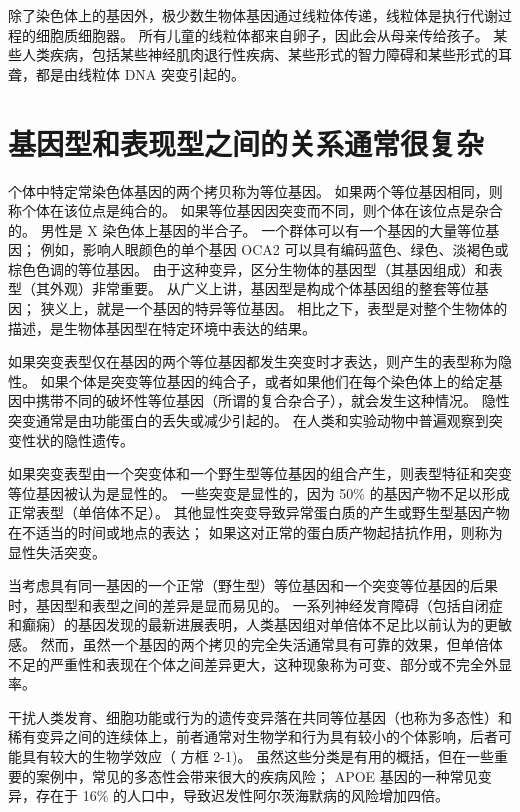 除了染色体上的基因外，极少数生物体基因通过线粒体传递，线粒体是执行代谢过程的细胞质细胞器。 
所有儿童的线粒体都来自卵子，因此会从母亲传给孩子。 某些人类疾病，包括某些神经肌肉退行性疾病、某些形式的智力障碍和某些形式的耳聋，都是由线粒体 DNA 突变引起的。


\section{基因型和表现型之间的关系通常很复杂}

个体中特定常染色体基因的两个拷贝称为等位基因。 
如果两个等位基因相同，则称个体在该位点是纯合的。 
如果等位基因因突变而不同，则个体在该位点是杂合的。 男性是 X 染色体上基因的半合子。 
一个群体可以有一个基因的大量等位基因； 
例如，影响人眼颜色的单个基因 OCA2 可以具有编码蓝色、绿色、淡褐色或棕色色调的等位基因。 
由于这种变异，区分生物体的基因型（其基因组成）和表型（其外观）非常重要。 
从广义上讲，基因型是构成个体基因组的整套等位基因； 狭义上，就是一个基因的特异等位基因。 
相比之下，表型是对整个生物体的描述，是生物体基因型在特定环境中表达的结果。

如果突变表型仅在基因的两个等位基因都发生突变时才表达，则产生的表型称为隐性。 
如果个体是突变等位基因的纯合子，或者如果他们在每个染色体上的给定基因中携带不同的破坏性等位基因（所谓的复合杂合子），就会发生这种情况。 
隐性突变通常是由功能蛋白的丢失或减少引起的。 
在人类和实验动物中普遍观察到突变性状的隐性遗传。


如果突变表型由一个突变体和一个野生型等位基因的组合产生，则表型特征和突变等位基因被认为是显性的。 
一些突变是显性的，因为 50\% 的基因产物不足以形成正常表型（单倍体不足）。 
其他显性突变导致异常蛋白质的产生或野生型基因产物在不适当的时间或地点的表达； 
如果这对正常的蛋白质产物起拮抗作用，则称为显性失活突变。


当考虑具有同一基因的一个正常（野生型）等位基因和一个突变等位基因的后果时，基因型和表型之间的差异是显而易见的。 
一系列神经发育障碍（包括自闭症和癫痫）的基因发现的最新进展表明，人类基因组对单倍体不足比以前认为的更敏感。 
然而，虽然一个基因的两个拷贝的完全失活通常具有可靠的效果，但单倍体不足的严重性和表现在个体之间差异更大，这种现象称为可变、部分或不完全外显率。


干扰人类发育、细胞功能或行为的遗传变异落在共同等位基因（也称为多态性）和稀有变异之间的连续体上，前者通常对生物学和行为具有较小的个体影响，后者可能具有较大的生物学效应（ 方框 2-1)。 
虽然这些分类是有用的概括，但在一些重要的案例中，常见的多态性会带来很大的疾病风险； 
APOE 基因的一种常见变异，存在于 16\% 的人口中，导致迟发性阿尔茨海默病的风险增加四倍。


